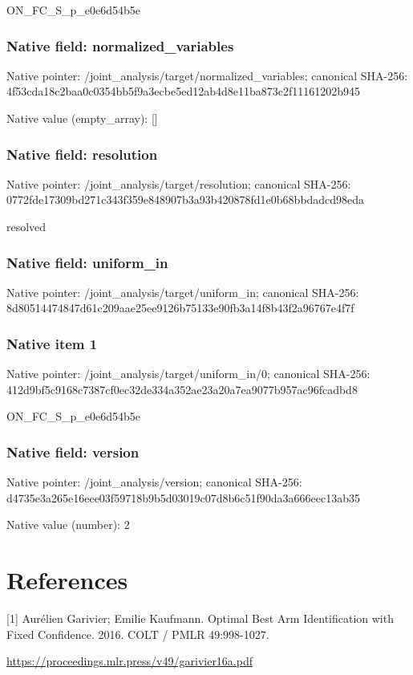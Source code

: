 \documentclass[10pt,a4paper]{article}
\begin{document}
\begingroup\raggedright\sloppy ON\_\allowbreak{}FC\_\allowbreak{}S\_\allowbreak{}p\_\allowbreak{}e0e6d54b5e\par\endgroup

\subsubsection{Native field: normalized\_\allowbreak{}variables}
Native pointer: /joint\_\allowbreak{}analysis/target/normalized\_\allowbreak{}variables; canonical SHA-256: 4f53cda18c2baa0c0354bb5f9a3ecbe5ed12ab4d8e11ba873c2f11161202b945

Native value (empty\_\allowbreak{}array): []

\subsubsection{Native field: resolution}
Native pointer: /joint\_\allowbreak{}analysis/target/resolution; canonical SHA-256: 0772fde17309bd271c343f359e848907b3a93b420878fd1e0b68bbdadcd98eda

\begingroup\raggedright\sloppy resolved\par\endgroup

\subsubsection{Native field: uniform\_\allowbreak{}in}
Native pointer: /joint\_\allowbreak{}analysis/target/uniform\_\allowbreak{}in; canonical SHA-256: 8d80514474847d61c209aae25ee9126b75133e90fb3a14f8b43f2a96767e4f7f

\subsubsection{Native item 1}
Native pointer: /joint\_\allowbreak{}analysis/target/uniform\_\allowbreak{}in/0; canonical SHA-256: 412d9bf5c9168c7387cf0ec32de334a352ae23a20a7ea9077b957ac96fcadbd8

\begingroup\raggedright\sloppy ON\_\allowbreak{}FC\_\allowbreak{}S\_\allowbreak{}p\_\allowbreak{}e0e6d54b5e\par\endgroup

\subsubsection{Native field: version}
Native pointer: /joint\_\allowbreak{}analysis/version; canonical SHA-256: d4735e3a265e16eee03f59718b9b5d03019c07d8b6c51f90da3a666eec13ab35

Native value (number): 2

\section{References}
[1] Aurélien Garivier; Emilie Kaufmann. Optimal Best Arm Identification with Fixed Confidence. 2016. COLT / PMLR 49:998-1027.

\url{https://proceedings.mlr.press/v49/garivier16a.pdf}
\end{document}
